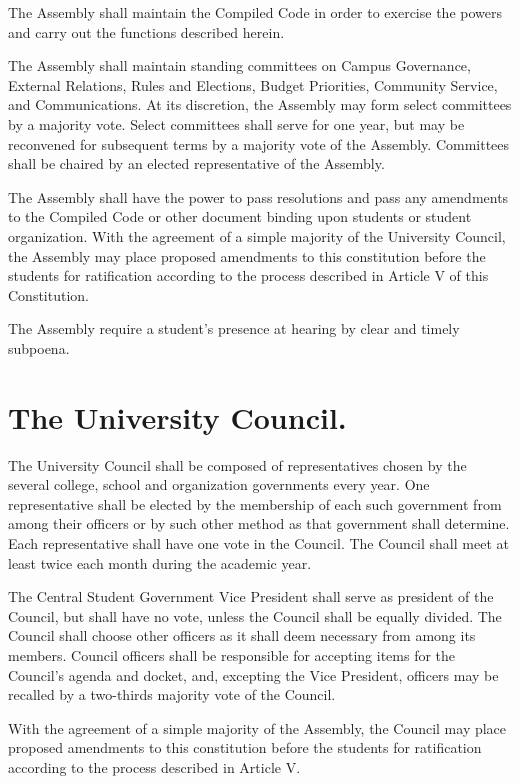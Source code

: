     The Assembly shall maintain the Compiled Code in order to exercise the powers and carry out the functions described herein.

    The Assembly shall maintain standing committees on Campus Governance, External Relations, Rules and Elections, Budget Priorities, Community Service, and Communications. At its discretion, the Assembly may form select committees by a majority vote. Select committees shall serve for one year, but may be reconvened for subsequent terms by a majority vote of the Assembly. Committees shall be chaired by an elected representative of the Assembly.

    The Assembly shall have the power to pass resolutions and pass any amendments to the Compiled Code or other document binding upon students or student organization. With the agreement of a simple majority of the University Council, the Assembly may place proposed amendments to this constitution before the students for ratification according to the process described in Article V of this Constitution.

    The Assembly require a student's presence at hearing by clear and timely subpoena.

\section{The University Council.}
    The University Council shall be composed of representatives chosen by the several college, school and organization governments every year. One representative shall be elected by the membership of each such government from among their officers or by such other method as that government shall determine. Each representative shall have one vote in the Council. The Council shall meet at least twice each month during the academic year.

    The Central Student Government Vice President shall serve as president of the Council, but shall have no vote, unless the Council shall be equally divided. The Council shall choose other officers as it shall deem necessary from among its members. Council officers shall be responsible for accepting items for the Council's agenda and docket, and, excepting the Vice President, officers may be recalled by a two-thirds majority vote of the Council.
  
    With the agreement of a simple majority of the Assembly, the Council may place proposed amendments to this constitution before the students for ratification according to the process described in Article V.

